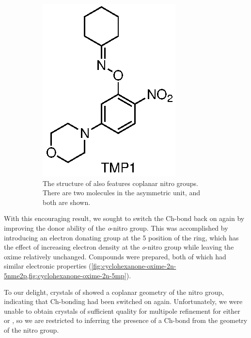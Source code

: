 \begin{refsection}
\begin{figure}
\begin{subfigure}[b]{0.47\linewidth}
        \includegraphics[scale=0.74]{Figures/cyclohexanone-oxime-2n-5mp.eps}
        \caption[Structure of .]{The structure of  also features coplanar nitro groups. There are two molecules in the asymmetric unit, and both are shown.}\label{fig:cyclohexanone-oxime-2n-5mp}
    \end{subfigure}
    \caption{}
\end{figure}

With this encouraging result, we sought to switch the Ch-bond back on again by improving the donor ability of the \emph{o}-nitro group.
This was accomplished by introducing an electron donating group at the 5 position of the ring, which has the effect of increasing electron density at the \emph{o}-nitro group while leaving the oxime relatively unchanged.
Compounds  were prepared, both of which had similar electronic properties (\cref{fig:cyclohexanone-oxime-2n-5nme2p,fig:cyclohexanone-oxime-2n-5mp}).

To our delight, crystals of  showed a coplanar geometry of the nitro group, indicating that Ch-bonding had been switched on again.
Unfortunately, we were unable to obtain crystals of sufficient quality for multipole refinement for either  or , so we are restricted to inferring the presence of a Ch-bond from the geometry of the nitro group.

\printbibliography[heading=subbibliography]
\end{refsection}